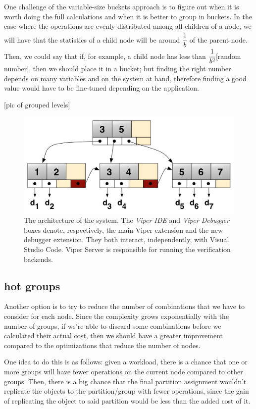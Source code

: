 One challenge of the variable-size buckets approach is to figure out when it is worth doing the full calculations and when it is better to group in buckets. In the case where the operations are evenly distributed among all children of a node, we will have that the statistics of a child node will be around $\cfrac{1}{b}$ of the parent node. Then, we could say that if, for example, a child node has less than $\cfrac{1}{b^2}$[random number], then we should place it in a bucket; but finding the right number depends on many variables and on the system at hand, therefore finding a good value would have to be fine-tuned depending on the application.

[pic of grouped levels]
\begin{figure}[htb]
  \centering
  \includegraphics[width=\textwidth,height=\textheight,keepaspectratio]{img/b+tree.png}
  \caption[The architecture of the system]{ The architecture of the system. The
    \textit{Viper IDE} and \textit{Viper Debugger} boxes denote, respectively,
    the main Viper extension and the new debugger extension. They both interact,
    independently, with Visual Studio Code. Viper Server is responsible for
    running the verification backends.}
  \label{fig:b+tree}
\end{figure}

\subsection{hot groups}\label{sec:hot-groups}
Another option is to try to reduce the number of combinations that we have to consider for each node. Since the complexity grows exponentially with the number of groups, if we're able to discard some combinations before we calculated their actual cost, then we should have a greater improvement compared to the optimizations that reduce the number of nodes.

One idea to do this is as follows: given a workload, there is a chance that one or more groups will have fewer operations on the current node compared to other groups. Then, there is a big chance that the final partition assignment wouldn't replicate the objects to the partition/group with fewer operations, since the gain of replicating the object to said partition would be less than the added cost of it.

